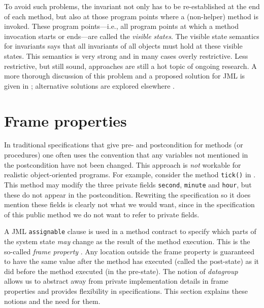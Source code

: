 \documentclass{llncs}
\begin{document}
To avoid such problems, the invariant not only has to be re-established at the
end of each method, but also at those program points where a
(non-helper) method is invoked.
These program points---i.e., all program points
at which a method invocation starts or ends---are called the \emph{visible
states}. The visible state semantics for invariants says that all invariants
of all objects must hold at these visible states.
%
This semantics is very strong and in many cases
overly restrictive.  Less restrictive, but still sound, approaches are still a
hot topic of ongoing research. A more thorough discussion of this problem
and a proposed solution for JML is given in 
\cite{Mueller-Poetzsch-Heffter-Leavens05}; alternative solutions are
explored elsewhere
\cite{BoogieInvariants,Huizing-Kuiper00,JacobsLeinoPiessensSchulte05,Middelkoop05}.

\section{Frame properties}
\label{Sec:assignable}

In traditional specifications that give pre- and postcondition for methods
(or procedures) one often uses the convention that any variables not mentioned 
in the postcondition have not been changed.  This approach is 
\emph{not} workable for realistic object-oriented programs.
For example, consider the method \texttt{tick()} in 
. This method may modify the three private 
fields \texttt{second}, \texttt{minute} and \texttt{hour}, but these do 
not appear in the postcondition. Rewriting the specification so it does 
mention these fields is clearly not what we would want, since in the 
specification of this public method we do not want to refer to private fields.

A JML \texttt{assignable} clause is used in a method contract to specify
which parts of the system state \emph{may} change as the result of the
method execution.  This is the so-called \emph{frame property}
\cite{Borgida-Mylopoulos-Reiter95}.
%
Any location outside the frame property is guaranteed to have the
same value after the method has executed (called the post-state) as it did
before the method executed (in the pre-state).
%
The notion of \emph{datagroup}~\cite{Leino98} allows us to abstract
away from private implementation  
details in frame properties and provides flexibility in specifications.
This section explains these notions and the need for them.
\end{document}
